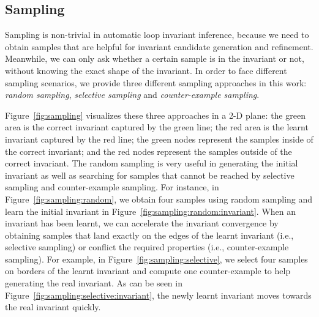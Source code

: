 \subsection{Sampling} %
\label{sub:sampling}

Sampling is non-trivial in automatic loop invariant inference, 
because we need to obtain samples that are helpful for invariant candidate generation and refinement. 
Meanwhile, we can only ask whether a certain sample is in the invariant or not, 
without knowing the exact shape of the invariant. 
In order to face different sampling scenarios,
we provide three different sampling approaches in this work:
\emph{random sampling}, \emph{selective sampling} and \emph{counter-example sampling}. 

Figure~\ref{fig:sampling} visualizes these three approaches in a 2-D plane: 
the green area is the correct invariant captured by the green line; 
the red area is the learnt invariant captured by the red line; 
the green nodes represent the samples inside of the correct invariant; 
and the red nodes represent the samples outside of the correct invariant. 
The random sampling is very useful in generating the initial invariant 
as well as searching for samples that cannot be reached 
by selective sampling and counter-example sampling. 
For instance, in Figure~\ref{fig:sampling:random}, 
we obtain four samples using random sampling 
and learn the initial invariant in Figure~\ref{fig:sampling:random:invariant}. 
When an invariant has been learnt, 
we can accelerate the invariant convergence by obtaining samples that 
land exactly on the edges of the learnt invariant (i.e., selective sampling) 
or conflict the required properties (i.e., counter-example sampling). 
For example, in Figure~\ref{fig:sampling:selective}, 
we select four samples on borders of the learnt invariant and 
compute one counter-example to help generating the real invariant. 
As can be seen in Figure~\ref{fig:sampling:selective:invariant}, 
the newly learnt invariant moves towards the real invariant quickly. 

